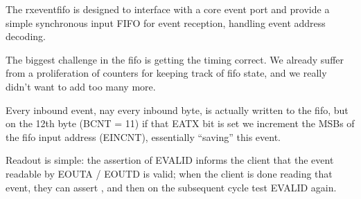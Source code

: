 

The rxeventfifo is designed to interface with a core event port and
provide a simple synchronous input FIFO for event reception, handling
event address decoding. 

The biggest challenge in the fifo is getting the timing correct. We
already suffer from a proliferation of counters for keeping track of
fifo state, and we really didn't want to add too many more.

Every inbound event, nay every inbound byte, is actually written to
the fifo, but on the 12th byte (BCNT = 11) if that EATX bit is set we
increment the MSBs of the fifo input address (EINCNT), essentially
``saving'' this event.

Readout is simple: the assertion of EVALID informs the client that the
event readable by EOUTA / EOUTD is valid; when the client is done
reading that event, they can assert , and then on the
subsequent cycle test EVALID again.
